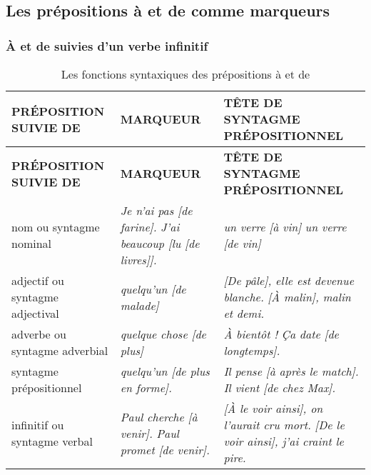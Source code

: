 \documentclass[UTF8]{report}
\begin{document}
\subsection{Les prépositions à et de comme marqueurs}

\subsubsection{À et de suivies d’un verbe infinitif}

\begin{table}[H]
    \centering
    \begin{longtable}{|m{4cm}|m{5.5cm}|m{5.5cm}|}
    \hline
    \rowcolor{cyan!20}
    \textbf{PRÉPOSITION SUIVIE DE} & \textbf{MARQUEUR} & \textbf{TÊTE DE SYNTAGME PRÉPOSITIONNEL} \\
    \hline
    \endfirsthead
    \hline
    \rowcolor{cyan!20}
    \textbf{PRÉPOSITION SUIVIE DE} & \textbf{MARQUEUR} & \textbf{TÊTE DE SYNTAGME PRÉPOSITIONNEL} \\
    \hline
    \endhead
    \hline
    \endfoot
    \hline
    \endlastfoot
    
    nom \newline ou syntagme nominal & \textit{Je n'ai pas [de farine].} \newline \textit{J'ai beaucoup [lu [de livres]].} & \textit{un verre [à vin]} \newline \textit{un verre [de vin]} \\
    \hline
    adjectif \newline ou syntagme adjectival & \textit{quelqu'un [de malade]} & \textit{[De pâle], elle est devenue blanche.} \newline \textit{[À malin], malin et demi.} \\
    \hline
    adverbe \newline ou syntagme adverbial & \textit{quelque chose [de plus]} & \textit{À bientôt !} \newline \textit{Ça date [de longtemps].} \\
    \hline
    syntagme prépositionnel & \textit{quelqu'un [de plus en forme].} & \textit{Il pense [à après le match].} \newline \textit{Il vient [de chez Max].} \\
    \hline
    infinitif \newline ou syntagme verbal & \textit{Paul cherche [à venir].} \newline \textit{Paul promet [de venir].} & \textit{[À le voir ainsi], on l'aurait cru mort.} \newline \textit{[De le voir ainsi], j'ai craint le pire.} \\
    \hline
    \end{longtable}
    \caption{Les fonctions syntaxiques des prépositions à et de}
\end{table}
\end{document}
